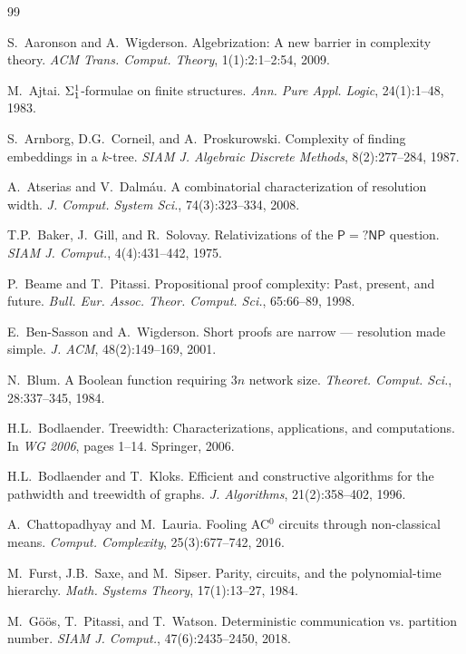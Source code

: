 \documentclass[11pt]{article}
\theoremstyle{plain}
\theoremstyle{definition}
\newcommand{\Pclass}{\mathsf{P}}
\newcommand{\NP}{\mathsf{NP}}
\begin{document}
\begin{thebibliography}{99}

S.~Aaronson and A.~Wigderson.
Algebrization: A new barrier in complexity theory.
\textit{ACM Trans. Comput. Theory}, 1(1):2:1--2:54, 2009.

M.~Ajtai.
$\Sigma\sp{1}\sb{1}$-formulae on finite structures.
\textit{Ann. Pure Appl. Logic}, 24(1):1--48, 1983.

S.~Arnborg, D.G.~Corneil, and A.~Proskurowski.
Complexity of finding embeddings in a $k$-tree.
\textit{SIAM J. Algebraic Discrete Methods}, 8(2):277--284, 1987.

A.~Atserias and V.~Dalm\'{a}u.
A combinatorial characterization of resolution width.
\textit{J. Comput. System Sci.}, 74(3):323--334, 2008.

T.P.~Baker, J.~Gill, and R.~Solovay.
Relativizations of the $\Pclass=?\NP$ question.
\textit{SIAM J. Comput.}, 4(4):431--442, 1975.

P.~Beame and T.~Pitassi.
Propositional proof complexity: Past, present, and future.
\textit{Bull. Eur. Assoc. Theor. Comput. Sci.}, 65:66--89, 1998.

E.~Ben-Sasson and A.~Wigderson.
Short proofs are narrow --- resolution made simple.
\textit{J. ACM}, 48(2):149--169, 2001.

N.~Blum.
A Boolean function requiring $3n$ network size.
\textit{Theoret. Comput. Sci.}, 28:337--345, 1984.

H.L.~Bodlaender.
Treewidth: Characterizations, applications, and computations.
In \textit{WG 2006}, pages 1--14. Springer, 2006.

H.L.~Bodlaender and T.~Kloks.
Efficient and constructive algorithms for the pathwidth and treewidth of graphs.
\textit{J. Algorithms}, 21(2):358--402, 1996.

A.~Chattopadhyay and M.~Lauria.
Fooling AC$^0$ circuits through non-classical means.
\textit{Comput. Complexity}, 25(3):677--742, 2016.

M.~Furst, J.B.~Saxe, and M.~Sipser.
Parity, circuits, and the polynomial-time hierarchy.
\textit{Math. Systems Theory}, 17(1):13--27, 1984.

M.~G\"{o}\"{o}s, T.~Pitassi, and T.~Watson.
Deterministic communication vs. partition number.
\textit{SIAM J. Comput.}, 47(6):2435--2450, 2018.


\end{thebibliography}
\end{document}
